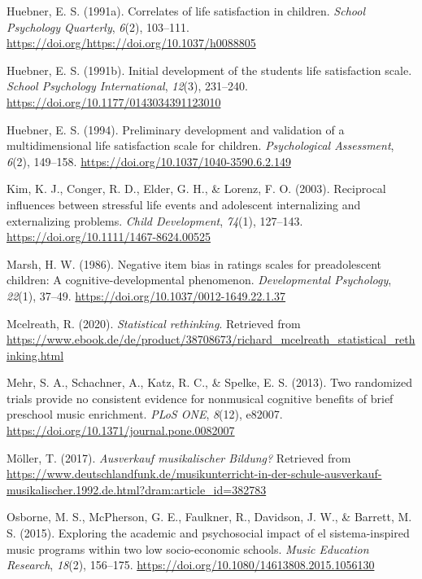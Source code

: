 \documentclass[a4, 12pt]{article}
\begin{document}
\leavevmode\hypertarget{ref-Huebner1991}{}%
Huebner, E. S. (1991a). Correlates of life satisfaction in children. \emph{School Psychology Quarterly}, \emph{6}(2), 103--111. \url{https://doi.org/https://doi.org/10.1037/h0088805}

\leavevmode\hypertarget{ref-Huebner1991a}{}%
Huebner, E. S. (1991b). Initial development of the students life satisfaction scale. \emph{School Psychology International}, \emph{12}(3), 231--240. \url{https://doi.org/10.1177/0143034391123010}

\leavevmode\hypertarget{ref-Huebner1994}{}%
Huebner, E. S. (1994). Preliminary development and validation of a multidimensional life satisfaction scale for children. \emph{Psychological Assessment}, \emph{6}(2), 149--158. \url{https://doi.org/10.1037/1040-3590.6.2.149}

\leavevmode\hypertarget{ref-Kim2003}{}%
Kim, K. J., Conger, R. D., Elder, G. H., \& Lorenz, F. O. (2003). Reciprocal influences between stressful life events and adolescent internalizing and externalizing problems. \emph{Child Development}, \emph{74}(1), 127--143. \url{https://doi.org/10.1111/1467-8624.00525}

\leavevmode\hypertarget{ref-Marsh1986}{}%
Marsh, H. W. (1986). Negative item bias in ratings scales for preadolescent children: A cognitive-developmental phenomenon. \emph{Developmental Psychology}, \emph{22}(1), 37--49. \url{https://doi.org/10.1037/0012-1649.22.1.37}

\leavevmode\hypertarget{ref-Mcelreath2020}{}%
Mcelreath, R. (2020). \emph{Statistical rethinking}. Retrieved from \url{https://www.ebook.de/de/product/38708673/richard_mcelreath_statistical_rethinking.html}

\leavevmode\hypertarget{ref-Mehr2013}{}%
Mehr, S. A., Schachner, A., Katz, R. C., \& Spelke, E. S. (2013). Two randomized trials provide no consistent evidence for nonmusical cognitive benefits of brief preschool music enrichment. \emph{PLoS ONE}, \emph{8}(12), e82007. \url{https://doi.org/10.1371/journal.pone.0082007}

\leavevmode\hypertarget{ref-Moeller2017}{}%
Möller, T. (2017). \emph{Ausverkauf musikalischer Bildung?} Retrieved from \url{https://www.deutschlandfunk.de/musikunterricht-in-der-schule-ausverkauf-musikalischer.1992.de.html?dram:article_id=382783}

\leavevmode\hypertarget{ref-Osborne2015}{}%
Osborne, M. S., McPherson, G. E., Faulkner, R., Davidson, J. W., \& Barrett, M. S. (2015). Exploring the academic and psychosocial impact of el sistema-inspired music programs within two low socio-economic schools. \emph{Music Education Research}, \emph{18}(2), 156--175. \url{https://doi.org/10.1080/14613808.2015.1056130}
\end{document}
